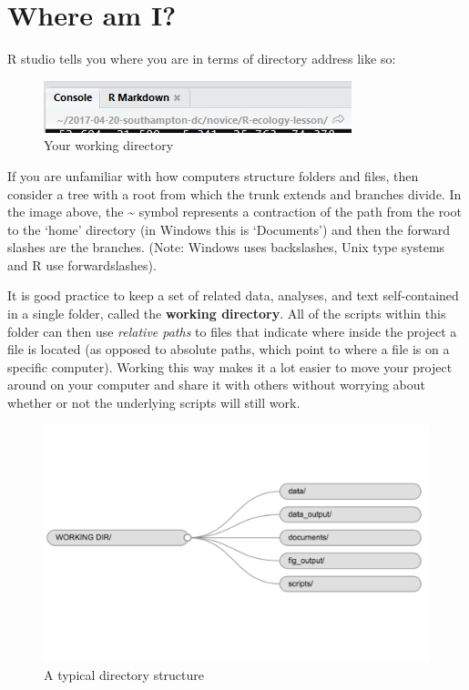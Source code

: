 \documentclass[12pt,]{book}
\theoremstyle{definition}
\theoremstyle{definition}
\theoremstyle{definition}
\theoremstyle{remark}
\begin{document}
\section{Where am I?}\label{where-am-i}

R studio tells you where you are in terms of directory address like so:



\begin{figure}

{\centering \includegraphics[width=0.8\linewidth]{img/rstudio_working_directory} 

}

\caption{Your working directory}\label{fig:working-directory}
\end{figure}

If you are unfamiliar with how computers structure folders and files,
then consider a tree with a root from which the trunk extends and
branches divide. In the image above, the \textasciitilde{} symbol
represents a contraction of the path from the root to the `home'
directory (in Windows this is `Documents') and then the forward slashes
are the branches. (Note: Windows uses backslashes, Unix type systems and
R use forwardslashes).

It is good practice to keep a set of related data, analyses, and text
self-contained in a single folder, called the \textbf{working
directory}. All of the scripts within this folder can then use
\emph{relative paths} to files that indicate where inside the project a
file is located (as opposed to absolute paths, which point to where a
file is on a specific computer). Working this way makes it a lot easier
to move your project around on your computer and share it with others
without worrying about whether or not the underlying scripts will still
work.



\begin{figure}

{\centering \includegraphics[width=0.8\linewidth]{img/R-ecology-work_dir_structure} 

}

\caption{A typical directory structure}\label{fig:dir-structure}
\end{figure}
\end{document}
